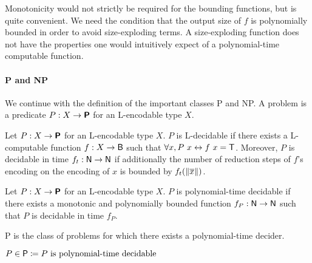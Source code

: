Monotonicity would not strictly be required for the bounding functions, but is quite convenient. We need the condition that the output size of $f$ is polynomially bounded in order to avoid size-exploding terms. A size-exploding function does not have the properties one would intuitively expect of a polynomial-time computable function.

\paragraph{\textsf{P} and \textsf{NP}}
We continue with the definition of the important classes \textsf{P} and \textsf{NP}. 
A problem is a predicate $P : X \rightarrow \textsf{\bfseries P}$ for an L-encodable type $X$.
\begin{definition}
  Let $P : X \rightarrow \textsf{\bfseries P}$ for an L-encodable type $X$. $P$ is L-decidable if there exists a L-computable function $f : X \rightarrow \textsf{B}$ such that 
  $\forall x, P~x \leftrightarrow f~x = \mathsf{T}$. 
  Moreover, $P$ is decidable in time $f_t : \mathsf{N} \rightarrow \mathsf{N}$ if additionally the number of reduction steps of $f$'s encoding on the encoding of $x$ is bounded by $f_t(\left\lVert\overline{x}\right\rVert)$.
\end{definition}

\begin{definition}
  Let $P : X \rightarrow \textsf{\bfseries P}$ for an L-encodable type $X$. $P$ is polynomial-time decidable if there exists a monotonic and polynomially bounded function $f_P : \mathsf{N} \rightarrow \mathsf{N}$ such that $P$ is decidable in time $f_P$. 
\end{definition}

\textsf{P} is the class of problems for which there exists a polynomial-time decider. 
\begin{definition}[\textsf{P}][inP]
  $P \in \normalfont{\textsf{P}} \coloneqq P \text{ is polynomial-time decidable} $
\end{definition}

